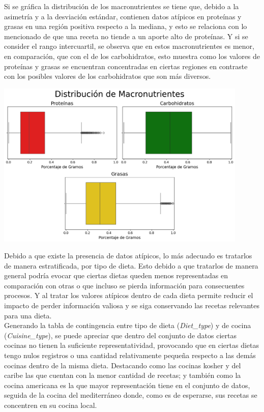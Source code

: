 \documentclass[12pt,a4paper]{article}
\begin{document}
        Si se gráfica la distribución de los macronutrientes se tiene que, debido 
        a la asimetría y a la desviación estándar, contienen datos atípicos en proteínas y grasas en una región 
        positiva respecto a la mediana, y esto se relaciona con lo mencionado de que 
        una receta no tiende a un aporte alto de proteínas. Y si se consider el rango 
        intercuartil, se observa que en estos macronutrientes es menor, en comparación, 
        que con el de los carbohidratos, esto muestra como los valores de proteínas y 
        grasas se encuentran concentradas en ciertas regiones en contraste con los posibles 
        valores de los carbohidratos que son más diversos.
        
        \begin{center}
            \includegraphics[width=0.90\textwidth]{Resources/2_02_plot_01.png}
        \end{center}

        Debido a que existe la presencia de datos atípicos, lo más adecuado es tratarlos 
        de manera estratificada, por tipo de dieta. Esto debido a que tratarlos de manera 
        general podría evocar que ciertas dietas queden menos representadas en comparación 
        con otras o que incluso se pierda información para consecuentes procesos. Y al 
        tratar los valores atípicos dentro de cada dieta permite reducir el impacto de 
        perder información valiosa y se siga conservando las recetas relevantes para una dieta.\\

        Generando la tabla de contingencia entre tipo de dieta (\emph{Diet\_type}) y de cocina (\emph{Cuisine\_type}), se puede apreciar 
        que dentro del conjunto de datos ciertas cocinas no tienen la suficiente representatividad, 
        provocando que en ciertas dietas tengo nulos registros o una cantidad relativamente pequeña 
        respecto a las demás cocinas dentro de la misma dieta. Destacando como las cocinas kosher y 
        del caribe las que cuentan con la menor cantidad de recetas; y también como la cocina americana 
        es la que mayor representación tiene en el conjunto de datos, seguida de la cocina del mediterráneo 
        donde, como es de esperarse, sus recetas se concentren en su cocina local.
    
\end{document}
